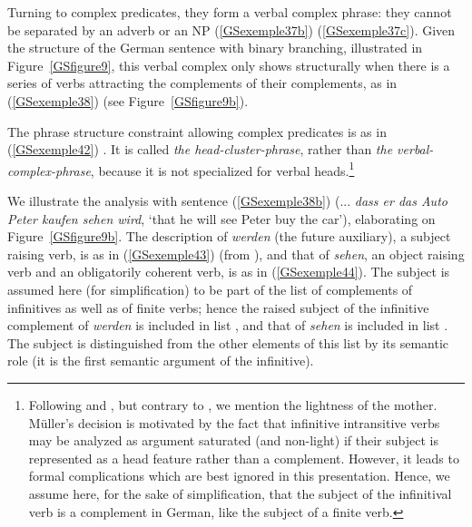 \documentclass[output=paper
                ,modfonts
                ,nonflat
	        ,collection
	        ,collectionchapter
	        ,collectiontoclongg
 	        ,biblatex
                ,babelshorthands
                ,newtxmath
                ,draftmode
                ,colorlinks, citecolor=brown
]{./langsci/langscibook}
\begin{document}
{%

Turning to complex predicates, they form a verbal complex phrase: they cannot be separated by an adverb or an NP (\ref{GSexemple37b}) (\ref{GSexemple37c}). Given the structure of the German sentence with binary branching, illustrated in Figure~\ref{GSfigure9}, this verbal complex only shows structurally when there is a series of verbs attracting the complements of their complements, as in (\ref{GSexemple38}) (see Figure~\ref{GSfigure9b}).

The phrase structure constraint allowing complex predicates is as in (\ref{GSexemple42}) \citep{MuellerCopula, muller2018clause}. It is called \emph{the head-cluster-phrase}, rather than \emph{the verbal-complex-phrase}, because it is not specialized for verbal heads.\footnote{Following \cite{HN94a} and \cite{dKM2001a}, but contrary to \cite{muller2018clause}, we mention the lightness of the mother. Müller’s decision is motivated by the fact that infinitive intransitive verbs may be analyzed as argument saturated (and non-light) if their subject is represented as a head feature rather than a complement. However, it leads to formal complications which are best ignored in this presentation. Hence, we assume here, for the sake of simplification, that the subject of the infinitival verb is a complement in German, like the subject of a finite verb.  }  

\begin{exe}
\end{exe}

We illustrate the analysis with sentence (\ref{GSexemple38b}) (... \emph{dass er das Auto Peter kaufen sehen wird}, `that he will see Peter buy the car’), elaborating on Figure~\ref{GSfigure9b}. The description of \emph{werden} (the future auxiliary), a subject raising verb, is as in (\ref{GSexemple43}) (from \citealt{muller2018clause}), and that of \emph{sehen}, an object raising verb and an obligatorily coherent verb, is as in (\ref{GSexemple44}). The subject is assumed here (for simplification) to be part of the list of complements of infinitives as well as of finite verbs; hence the raised subject of the infinitive complement of \emph{werden} is included in list , and that of \emph{sehen} is included in list . The subject is distinguished from the other elements of this list by its semantic role (it is the first semantic argument of the infinitive).     

}
\end{document}
